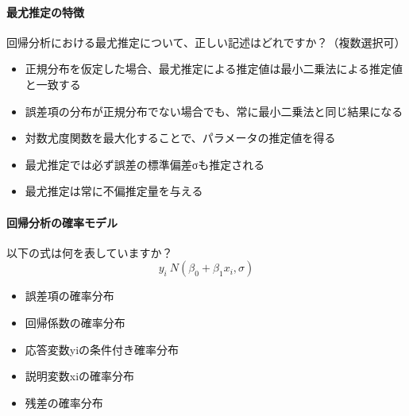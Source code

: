 \documentclass{ltjbook}
\begin{document}
\paragraph{最尤推定の特徴}回帰分析における最尤推定について、正しい記述はどれですか？（複数選択可）
\begin{itemize}
	\item 正規分布を仮定した場合、最尤推定による推定値は最小二乗法による推定値と一致する
	\item 誤差項の分布が正規分布でない場合でも、常に最小二乗法と同じ結果になる
	\item 対数尤度関数を最大化することで、パラメータの推定値を得る
	\item 最尤推定では必ず誤差の標準偏差σも推定される
	\item 最尤推定は常に不偏推定量を与える
\end{itemize}

\paragraph{回帰分析の確率モデル}以下の式は何を表していますか？
$$ y_i ~ N(\beta_0 +\beta_1x_i, \sigma) $$
\begin{itemize}
	\item 誤差項の確率分布
	\item 回帰係数の確率分布
	\item 応答変数yiの条件付き確率分布
	\item 説明変数xiの確率分布
	\item 残差の確率分布
\end{itemize}
\end{document}
